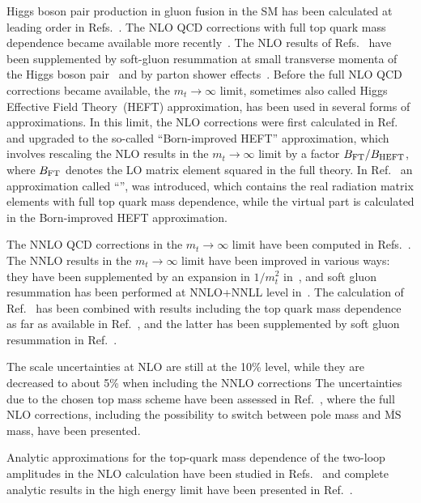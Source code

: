 Higgs boson pair production in gluon fusion in the SM has been calculated at leading order in Refs.~\cite{Eboli:1987dy,Glover:1987nx,Plehn:1996wb}.
The NLO QCD corrections with full top quark mass dependence became available more recently~\cite{Borowka:2016ehy,Borowka:2016ypz,Baglio:2018lrj}.
The NLO results of Refs.~\cite{Borowka:2016ehy,Borowka:2016ypz} have been supplemented by soft-gluon resummation at small transverse momenta of the Higgs boson pair~\cite{Ferrera:2016prr}
and by parton shower effects~\cite{Heinrich:2017kxx,Jones:2017giv}.
Before the full NLO QCD corrections became available, the $m_t\to\infty$ limit, sometimes also called Higgs Effective Field Theory~(HEFT) approximation,
has been used in several forms of approximations. 
In this limit, the NLO corrections were first calculated in 
Ref.~\cite{Dawson:1998py} and upgraded to the so-called ``Born-improved HEFT'' approximation, 
which involves rescaling the NLO results in the $m_t\to\infty$ limit by a factor $B_{\rm FT}/B_{\rm HEFT}$, where $B_{\rm FT}$
denotes the LO matrix element squared in the full theory.
In Ref.~\cite{Maltoni:2014eza} an approximation called
``\ftapprox'', was introduced, which contains the real radiation matrix elements 
with full top quark mass dependence, while the virtual part is
calculated in the Born-improved HEFT approximation.

The NNLO QCD corrections in the $m_t\to\infty$ limit have been computed in Refs.~\cite{deFlorian:2013uza,deFlorian:2013jea,Grigo:2014jma,deFlorian:2016uhr}. 
The NNLO results in the $m_t\to\infty$ limit have been improved in various ways: they have been supplemented by an expansion in $1/m_t^2$ in~\cite{Grigo:2015dia}, and soft gluon resummation has been performed at NNLO+NNLL level in~\cite{deFlorian:2015moa}. 
 The calculation of Ref.~\cite{deFlorian:2016uhr} has been combined with results including the top quark mass dependence as far as available in Ref.~\cite{Grazzini:2018bsd}, and the latter has been supplemented by soft gluon resummation in Ref.~\cite{deFlorian:2018tah}. 

The scale uncertainties at NLO are still at the 10\% level, while they are decreased to about 5\% when including the NNLO corrections
The uncertainties due to the chosen top mass scheme have been assessed in Ref.~\cite{Baglio:2018lrj}, where the full NLO corrections, including the possibility to switch between pole mass and $\overline{\mathrm{MS}}$ mass, have been presented.

Analytic approximations for the top-quark mass dependence of the two-loop amplitudes in the NLO calculation have been studied in Refs.~\cite{Grober:2017uho,Bonciani:2018omm,Xu:2018eos,Davies:2018ood} and complete analytic results in the high energy limit have been presented in Ref.~\cite{Davies:2018qvx}.



